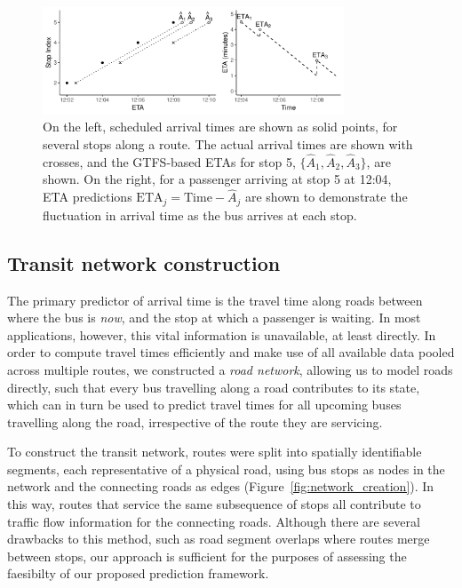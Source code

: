 \begin{figure}[tb]
    \centering
    \includegraphics[width=0.8\textwidth]{figures/02_gtfs_delays.pdf}
    \caption{
        On the left, scheduled arrival times are shown as solid points,
        for several stops along a route. The actual arrival times
        are shown with crosses,
        and the GTFS-based ETAs for stop 5, $\{\hat A_1, \hat A_2, \hat A_3\}$, are shown.
        On the right,
        for a passenger arriving at stop 5 at 12:04,
        ETA predictions
        $\mathrm{ETA}_j = \mathrm{Time} - \hat A_j$ are shown
        to demonstrate the fluctuation in
        arrival time as the bus arrives at each stop.
    }
    \label{fig:gtfs-delays}
\end{figure}



\subsection{Transit network construction}
\label{sec:network_build}

The primary predictor of arrival time is 
the travel time along roads between where the bus is \emph{now},
and the stop at which a passenger is waiting.
In most applications, however, this vital information is unavailable, at least directly.
In order to compute travel times efficiently
and make use of all available data pooled across multiple routes,
we constructed a \emph{road network},
allowing us to model roads directly,
such that every bus travelling along a road contributes to its state,
which can in turn be used to predict travel times for all upcoming buses 
travelling along the road,
irrespective of the route they are servicing.


To construct the transit network,
routes were split into spatially identifiable segments,
each representative of a physical road,
using bus stops as nodes in the network
and the connecting roads as edges
(Figure~\ref{fig:network_creation}).
In this way, routes that service the same subsequence of stops
all contribute to traffic flow information for the connecting roads.
Although there are several drawbacks to this method,
such as road segment overlaps where routes merge between stops,
our approach is sufficient for the purposes of assessing the \rt 
faesibilty of our proposed prediction framework.



